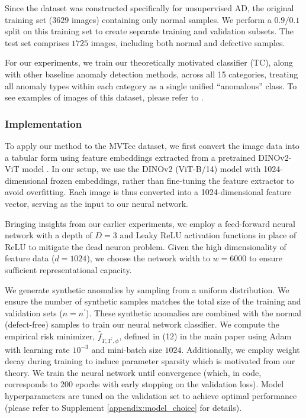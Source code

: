 \documentclass{article}
\begin{document}
Since the dataset was constructed specifically for unsupervised AD, the original training set ($3629$ images) containing only normal samples. We perform a $0.9/0.1$ split on this training set to create separate training and validation subsets. The test set comprises $1725$ images, including both normal and defective samples. 

For our experiments, we train our theoretically motivated classifier (TC), along with other baseline anomaly detection methods, across all 15 categories, treating all anomaly types within each category as a single unified “anomalous” class. To see examples of images of this dataset, please refer to \citep{bergmann2019mvtec}.

\subsubsection{Implementation}
To apply our method to the MVTec dataset, we first convert the image data into a tabular form using feature embeddings extracted from a pretrained DINOv2-ViT model \citep{oquab2024dinov2}. In our setup, we use the DINOv2 (ViT-B/14) model with 1024-dimensional frozen embeddings, rather than fine-tuning the feature extractor to avoid overfitting. Each image is thus converted into a  1024-dimensional feature vector, serving as the input to our neural network.

Bringing insights from our earlier experiments, we employ a feed-forward neural network with a depth of $D=3$ and Leaky ReLU activation functions in place of ReLU to mitigate the dead neuron problem. Given the high dimensionality of feature data ($d=1024$), we choose the network width to $w = 6000$ to ensure sufficient representational capacity. 

We generate synthetic anomalies by sampling from a uniform distribution. We ensure the number of synthetic samples matches the total size of the training and validation sets ($n=n^\prime$). These synthetic anomalies are combined with the normal (defect-free) samples to train our neural network classifier. 
We compute the empirical risk minimizer, $\widehat{f}_{T, T^\prime,\phi}$, defined in (12) in the main paper using  Adam with learning rate $10^{-3}$ and mini-batch size $1024$. Additionally, we employ weight decay during training to induce parameter sparsity which is motivated from our theory. We train the neural network until convergence (which, in code, corresponds to 200 epochs
with early stopping on the validation loss). Model hyperparameters are tuned on the validation set to achieve optimal performance (please refer to Supplement \ref{appendix:model_choice} for details). 
\end{document}
